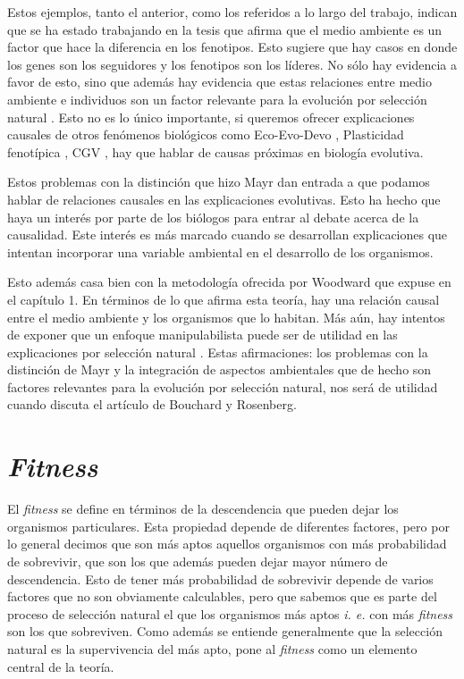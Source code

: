 Estos ejemplos, tanto el anterior, como los referidos a lo largo del trabajo, indican que se ha estado trabajando en la tesis que afirma que el medio ambiente es un factor que hace la diferencia en los fenotipos. Esto sugiere que hay casos en donde los genes son los seguidores y los fenotipos son los líderes. No sólo hay evidencia a favor de esto, sino que además hay evidencia que estas relaciones entre medio ambiente e individuos son un factor relevante para la evolución por selección natural \cite{Jablonka2020, Dayan2020, MacColl2011}. Esto no es lo único importante, si queremos ofrecer explicaciones causales de otros fenómenos biológicos como Eco-Evo-Devo \cite{PfenningEco-Evo-Devo}, Plasticidad fenotípica \cite{WESTEBERHARD20082701}, CGV \cite{CVG}, hay que hablar de causas próximas en biología evolutiva.

Estos problemas con la distinción que hizo Mayr dan entrada a que podamos hablar de relaciones causales en las explicaciones evolutivas. Esto ha hecho que haya un interés por parte de los biólogos para entrar al debate acerca de la causalidad. Este interés es más marcado cuando se desarrollan explicaciones que intentan incorporar una variable ambiental en el desarrollo de los organismos.

Esto además casa bien con la metodología ofrecida por Woodward que expuse en el capítulo 1. En términos de lo que afirma esta teoría, hay una relación causal entre el medio ambiente y los organismos que lo habitan. Más aún, hay intentos de exponer que un enfoque manipulabilista puede ser de utilidad en las explicaciones por selección natural \cite{MacColl2011}. Estas afirmaciones: los problemas con la distinción de Mayr y la integración de aspectos ambientales que de hecho son factores relevantes para la evolución por selección natural, nos será de utilidad cuando discuta el artículo de Bouchard y Rosenberg.


\section{\emph{Fitness}}

El \emph{fitness} se define en términos de la descendencia que pueden dejar los organismos particulares. Esta propiedad depende de diferentes factores, pero por lo general decimos que son más aptos aquellos organismos con más probabilidad de sobrevivir, que son los que además pueden dejar mayor número de descendencia. Esto de tener más probabilidad de sobrevivir depende de varios factores que no son obviamente calculables, pero que sabemos que es parte del proceso de selección natural el que los organismos más aptos \emph{i. e.} con más \emph{fitness} son los que sobreviven. Como además se entiende generalmente que la selección natural es la supervivencia del más apto, pone al \emph{fitness} como un elemento central de la teoría.

